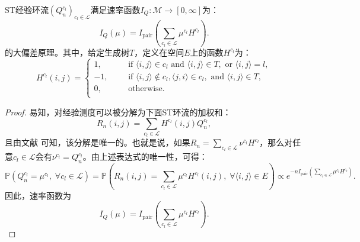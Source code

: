 \begin{proposition}
	ST经验环流$(Q_n^{c_l})_{c_l\in\mathcal{L}}$满足速率函数$I_Q:\mathcal{M}\rightarrow[0,\infty]$为：
	\begin{equation}\label{formula:I_Q}
	I_Q(\mu)=I_{\mathrm{pair}}\left(\sum_{c_l\in\mathcal{L}}\mu^{c_l}H^{c_l}\right).
	\end{equation}
	的大偏差原理。其中，给定生成树$T$，定义在空间$E$上的函数$H^{c_l}$为：
	\begin{equation*}\label{cycle function2}
	H^{c_l}(i,j)
		=\left\{\begin{aligned}
		1, &   && \text{if } \langle i,j\rangle \in c_l \text{ and }\langle i,j\rangle \in T, \text{ or } \langle i,j\rangle=l,\\
		-1,&   && \text{if } \langle i,j\rangle\notin c_l,\langle j,i\rangle \in c_l,\text{ and }\langle i,j\rangle \in T,\\
		0, &   && \text{otherwise}.\\
		\end{aligned}\right.
	\end{equation*}
\end{proposition}
\begin{proof}
	易知，对经验测度可以被分解为下面ST环流的加权和：
	\begin{equation*}
	R_n(i,j) = \sum_{c_l\in\mathcal{L}}H^{c_l}(i,j)Q^{c_l}_n,
	\end{equation*}
	且由文献 \cite{kalpazidou2007cycle}可知，该分解是唯一的。也就是说，如果$R_n =\sum_{c_l \in \mathcal{L}}\nu^{c_l}H^{c_l}$，那么对任意$c_l \in \mathcal{L}$会有$\nu^{c_l}=Q_n^{c_l}$。由上述表达式的唯一性，可得：
	\begin{equation*}
		\mathbb{P}(Q_n^{c_l}=\mu^{c_l},\;\forall c_l\in\mathcal{L})
		=\mathbb{P}\left(R_n(i,j)=\sum_{c_l\in\mathcal{L}}\mu^{c_l}H^{c_l}(i,j),\;\forall\langle i,j\rangle\in E\right)
		\propto e^{-n I_{\mathrm{pair}}\left(\sum_{c_l\in\mathcal{L}}\mu^{c_l}H^{c_l}\right)}.
	\end{equation*}
	因此，速率函数为
	\begin{equation}\label{formula:I_Q}
		I_Q(\mu)=I_{\mathrm{pair}}\left(\sum_{c_l\in\mathcal{L}}\mu^{c_l}H^{c_l}\right).
	\end{equation}
\end{proof}

